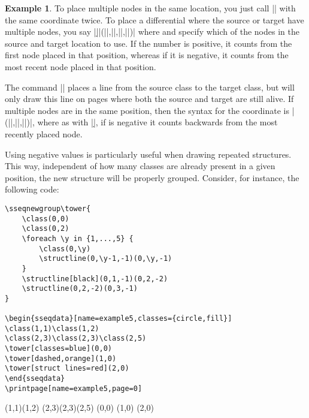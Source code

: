 \documentclass{ltxdoc}
\theoremstyle{definition}
\newtheorem{ex}{Example}
\begin{document}
\begin{ex}
To place multiple nodes in the same location, you just call |\class| with the same coordinate twice. To place a differential where the source or target have multiple nodes, you say |\d||(||,||,||,||)| where  and  specify which of the nodes in the source and target location to use. If the number  is positive, it counts from the first node placed in that position, whereas if it is negative, it counts from the most recent node placed in that position.

The command |\structline| places a line from the source class to the target class, but will only draw this line on pages where both the source and target are still alive. If multiple nodes are in the same position, then the syntax for the coordinate is |(||,||,||)|, where as with |\d|, if  is negative it counts backwards from the most recently placed node.

Using negative values is particularly useful when drawing repeated structures. This way, independent of how many classes are already present in a given position, the new structure will be properly grouped. Consider, for instance, the following code:

\begin{minipage}{0.7\textwidth}
\begin{verbatim}
\sseqnewgroup\tower{
    \class(0,0)
    \class(0,2)
    \foreach \y in {1,...,5} {
        \class(0,\y)
        \structline(0,\y-1,-1)(0,\y,-1)
    }
    \structline[black](0,1,-1)(0,2,-2)
    \structline(0,2,-2)(0,3,-1)
}

\begin{sseqdata}[name=example5,classes={circle,fill}]
\class(1,1)\class(1,2)
\class(2,3)\class(2,3)\class(2,5)
\tower[classes=blue](0,0)
\tower[dashed,orange](1,0)
\tower[struct lines=red](2,0)
\end{sseqdata}
\printpage[name=example5,page=0]
\end{verbatim}
\end{minipage}
\begin{minipage}{0.25\textwidth}
\sseqnewgroup{}

\begin{sseqdata}[name=example5,classes={circle,fill}]
\class(1,1)\class(1,2)
\class(2,3)\class(2,3)\class(2,5)
\tower[classes=blue](0,0)
\tower[struct lines=dashed,orange](1,0)
\tower[struct lines=red](2,0)
\end{sseqdata}
\printpage[name=example5,page=0]
\end{minipage}
\end{ex}
\end{document}
